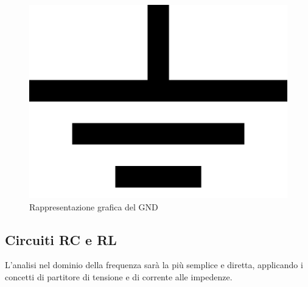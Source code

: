 \documentclass{article}
\begin{document}
\begin{figure}[h]
  \centering
  \includegraphics[scale=0.1]{IM_GND.png}
  \caption{Rappresentazione grafica del GND}
  \label{GND}
\end{figure}

\subsection{Circuiti RC e RL}

L'analisi nel dominio della frequenza sarà la più semplice e diretta, applicando i concetti di partitore di tensione e di corrente alle impedenze.
\end{document}
